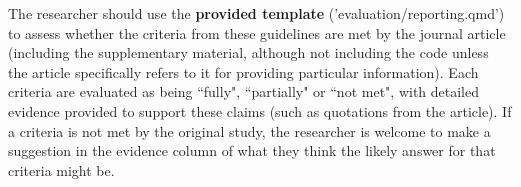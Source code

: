 The researcher should use the \textbf{provided template} ('evaluation/reporting.qmd') to assess whether the criteria from these guidelines are met by the journal article (including the supplementary material, although not including the code unless the article specifically refers to it for providing particular information). Each criteria are evaluated as being ``fully", ``partially" or ``not met", with detailed evidence provided to support these claims (such as quotations from the article). If a criteria is not met by the original study, the researcher is welcome to make a suggestion in the evidence column of what they think the likely answer for that criteria might be.